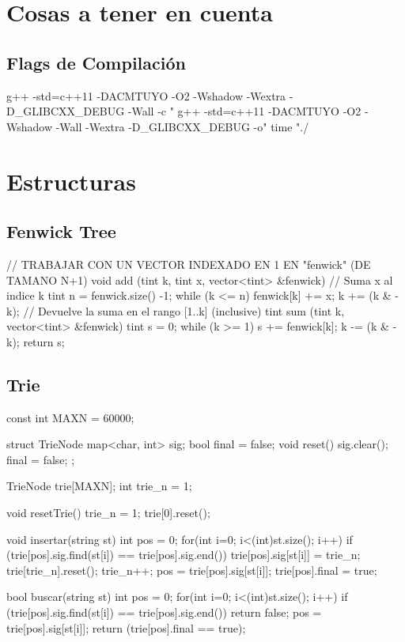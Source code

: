 \section*{Cosas a tener en cuenta}
\subsection*{Flags de Compilaci\'on}
\begin{code}
g++ -std=c++11 -DACMTUYO -O2 -Wshadow -Wextra -D_GLIBCXX_DEBUG -Wall -c "%
g++ -std=c++11 -DACMTUYO -O2 -Wshadow -Wall -Wextra -D_GLIBCXX_DEBUG -o"%
time "./%
\end{code}

\section{Estructuras}

\subsection{Fenwick Tree}
\begin{code}
// TRABAJAR CON UN VECTOR INDEXADO EN 1 EN "fenwick" (DE TAMANO N+1)
void add (tint k, tint x, vector<tint> &fenwick) { // Suma x al indice k 
	tint n = fenwick.size() -1;
	while (k <= n) {
		fenwick[k] += x;
		k += (k & -k);
	}
}
// Devuelve la suma en el rango [1..k] (inclusive)
tint sum (tint k, vector<tint> &fenwick) {
	tint s = 0;
	while (k >= 1) {
		s += fenwick[k];
		k -= (k & -k);
	}
	return s;
}
\end{code}

\subsection{Trie}
\begin{code}
const int MAXN = 60000;

struct TrieNode {
  map<char, int> sig; 
  bool final = false;
  void reset() { sig.clear(); final = false; }
};

TrieNode trie[MAXN];
int trie_n = 1;

void resetTrie() {
  trie_n = 1;
  trie[0].reset();
}

void insertar(string st) {
  int pos = 0;
  for(int i=0; i<(int)st.size(); i++) {
    if (trie[pos].sig.find(st[i]) == trie[pos].sig.end()) {
      trie[pos].sig[st[i]] = trie_n;
      trie[trie_n].reset();
      trie_n++;
    }
    pos = trie[pos].sig[st[i]];
  }
  trie[pos].final = true;
}

bool buscar(string st) {
  int pos = 0;
  for(int i=0; i<(int)st.size(); i++) {
    if (trie[pos].sig.find(st[i]) == trie[pos].sig.end())
      return false;
    pos = trie[pos].sig[st[i]];
  }
  return (trie[pos].final == true);
}
\end{code}

